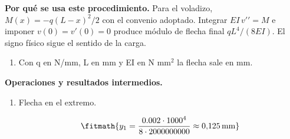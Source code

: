 \noindent\textbf{Por qué se usa este procedimiento.} Para el voladizo, $M(x)=-q(L-x)^2/2$ con el convenio adoptado. Integrar $EI\,v\prime\prime=M$ e imponer $v(0)=v\prime(0)=0$ produce módulo de flecha final $qL^4/(8EI)$. El signo físico sigue el sentido de la carga.

\begin{enumerate}

\item Con q en N/mm, L en mm y EI en N mm$^2$ la flecha sale en mm.

\end{enumerate}

\noindent\textbf{Operaciones y resultados intermedios.}

\begin{enumerate}

\item Flecha en el extremo.

\[\fitmath{y_{1}=\frac{0.002\cdot {1000}^{4}}{8\cdot 2000000000}\approx 0{,}125\,\mathrm{mm}}\]

\end{enumerate}
